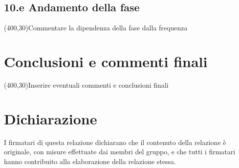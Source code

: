 \documentclass[10pt,a4paper]{article}
\begin{document}
\subsection*{10.e Andamento della fase}
\vspace{0.5cm}
\framebox(400,30){Commentare la dipendenza della fase dalla frequenza}

\section*{Conclusioni e commenti finali}
\framebox(400,30){Inserire eventuali commenti e conclusioni finali}

\section*{Dichiarazione}
I firmatari di questa relazione dichiarano che il contenuto della relazione \`e 
originale, con misure effettuate dai membri del gruppo, e che tutti i firmatari 
hanno contribuito alla elaborazione della relazione stessa.
\end{document}
